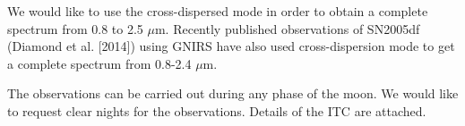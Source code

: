 \documentclass[11pt]{article}
\begin{document}
We would like to use the cross-dispersed mode in order to obtain a complete spectrum from 0.8 to 2.5 $\mu$m. Recently published observations of SN2005df (Diamond et al. [2014]) using GNIRS have also used cross-dispersion mode to get a complete spectrum from 0.8-2.4 $\mu$m.

The observations can be carried out during any phase of the moon. We would like to request clear nights for the observations. Details of the ITC are attached. 
\bigskip



\bandthreeplan    %


\bigskip



\classicalbackup    %


\bigskip


\end{document}
